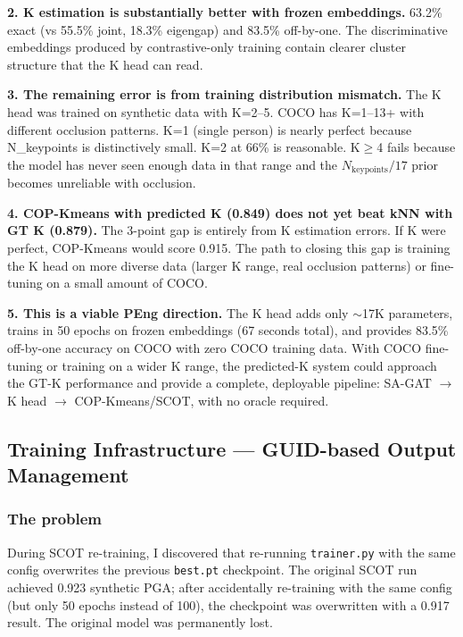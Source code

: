 \textbf{2. K estimation is substantially better with frozen embeddings.} 63.2\% exact (vs 55.5\% joint, 18.3\% eigengap) and 83.5\% off-by-one. The discriminative embeddings produced by contrastive-only training contain clearer cluster structure that the K head can read.

\textbf{3. The remaining error is from training distribution mismatch.} The K head was trained on synthetic data with K=2--5. COCO has K=1--13+ with different occlusion patterns. K=1 (single person) is nearly perfect because N\_keypoints is distinctively small. K=2 at 66\% is reasonable. K$\geq$4 fails because the model has never seen enough data in that range and the $N_{\text{keypoints}} / 17$ prior becomes unreliable with occlusion.

\textbf{4. COP-Kmeans with predicted K (0.849) does not yet beat kNN with GT K (0.879).} The 3-point gap is entirely from K estimation errors. If K were perfect, COP-Kmeans would score 0.915. The path to closing this gap is training the K head on more diverse data (larger K range, real occlusion patterns) or fine-tuning on a small amount of COCO.

\textbf{5. This is a viable PEng direction.} The K head adds only $\sim$17K parameters, trains in 50 epochs on frozen embeddings (67 seconds total), and provides 83.5\% off-by-one accuracy on COCO with zero COCO training data. With COCO fine-tuning or training on a wider K range, the predicted-K system could approach the GT-K performance and provide a complete, deployable pipeline: SA-GAT $\to$ K head $\to$ COP-Kmeans/SCOT, with no oracle required.


\subsection{Training Infrastructure --- GUID-based Output Management}

\subsubsection{The problem}

During SCOT re-training, I discovered that re-running \texttt{trainer.py} with the same config overwrites the previous \texttt{best.pt} checkpoint. The original SCOT run achieved 0.923 synthetic PGA; after accidentally re-training with the same config (but only 50 epochs instead of 100), the checkpoint was overwritten with a 0.917 result. The original model was permanently lost.

